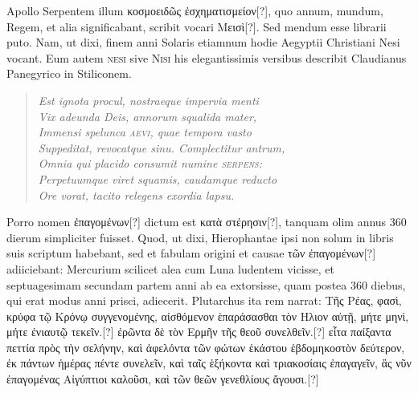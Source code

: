 Apollo Serpentem illum \textgreek{κοσμοειδῶς ἐσχηματισμείον}[?],
 quo annum, mundum,
Regem, et alia significabant, scribit vocari \textgreek{Μεισὶ}[?].
Sed mendum
esse librarii puto.
Nam, ut dixi, finem anni Solaris etiamnum
hodie Aegyptii Christiani Nesi vocant.
Eum autem \textsc{nesi} sive \textsc{Nisi}
his elegantissimis versibus describit Claudianus Panegyrico
  in
Stiliconem.
\begin{verse}
\textit{Est ignota procul, nostraeque impervia menti\\
  Vix adeunda Deis, annorum squalida mater,\\
  Immensi spelunca \textsc{aevi}, quae tempora vasto\\
  Suppeditat, revocatque sinu. Complectitur antrum,\\
  Omnia qui placido consumit numine \textsc{serpens}:\\
  Perpetuumque viret squamis, caudamque reducto\\
  Ore vorat, tacito relegens exordia lapsu.
}
\end{verse}
%
Porro nomen \textgreek{ἐπαγομένων}[?] dictum est
 \textgreek{κατὰ στέρησιν}[?], tanquam olim annus
360 dierum simpliciter fuisset.
Quod, ut dixi, Hierophantae
ipsi non solum in libris suis scriptum habebant, sed et fabulam origini
et causae \textgreek{τῶν ἐπαγομένων}[?] adiiciebant: Mercurium scilicet alea
cum Luna ludentem vicisse, et septuagesimam secundam partem
anni ab ea extorsisse, quam postea 360 diebus, qui erat modus anni
prisci, adiecerit.
Plutarchus ita rem narrat: \textgreek{Τῆς Ρέας, φασὶ, κρύφα
τῷ Κρόνῳ συγγενομένης, αἰσθόμενον ὲπαράσασθαι τὸν Ηλιον αὐτῇ, μήτε μηνὶ,
μήτε ἐνιαυτῷ τεκεῖν.}[?]
\textgreek{ἐρῶντα δὲ τὸν Ερμῆν τῆς θεοῦ συνελθεῖν.}[?]
\textgreek{εἶτα παίξαντα
πεττία πρὸς τὴν σελήνην, καὶ ἀφελόντα τῶν φώτων ἑκάστου ἑβδομηκοστὸν δεύτερον,
ἐκ πάντων ἡμέρας πέντε συνελεῖν, καὶ ταῖς ἑξήκοντα καὶ τριακοσίαις
ἐπαγαγεῖν, ἃς νῦν ἐπαγομένας
Αἰγύπτιοι καλοῦσι, καὶ τῶν θεῶν γενεθλίους
ἄγουσι.}[?]

